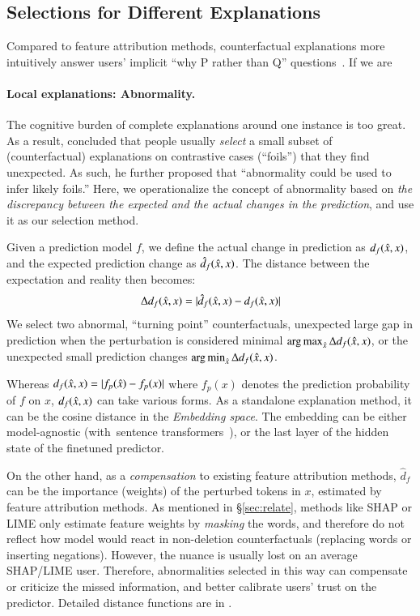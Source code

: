 \subsection{Selections for Different Explanations}

Compared to feature attribution methods, counterfactual explanations more intuitively answer users' implicit ``why P rather than Q'' questions~\cite{miller}.
If we are 


\paragraph{Local explanations: Abnormality.}
The cognitive burden of complete explanations around one instance is too great.
As a result, \citet{miller} concluded that people usually \emph{select} a small subset of (counterfactual) explanations on contrastive cases (``foils'') that they find unexpected. 
As such, he further proposed that ``abnormality could be used to infer likely foils.''
Here, we operationalize the concept of abnormality based on \emph{the discrepancy between the expected and the actual changes in the prediction}, and use it as our selection method.

Given a prediction model $f$, we define the actual change in prediction as $d_f(\hat{x}, x)$, and the expected prediction change as $\hat{d}_f(\hat{x}, x)$.
The distance between the expectation and reality then becomes:
$$\Delta d_f(\hat{x}, x) = |\hat{d}_f(\hat{x}, x)-d_f(\hat{x}, x)|$$
We select two abnormal, ``turning point'' counterfactuals, \ie unexpected large gap in prediction when the perturbation is considered minimal $\operatorname*{arg\,max}_{\hat{x}} \Delta d_f(\hat{x}, x)$, or the unexpected small prediction changes $\operatorname*{arg\,min}_{\hat{x}} \Delta d_f(\hat{x}, x)$.

Whereas $d_f(\hat{x}, x)=|f_p(\hat{x})-f_p(x)|$ where $f_p(x)$ denotes the prediction probability of $f$ on $x$, $d_f(\hat{x}, x)$ can take various forms. 
As a standalone explanation method, it can be the cosine distance in the \emph{Embedding space}.
The embedding can be either model-agnostic (\eg with~sentence transformers~\cite{reimers-2019-sentence-bert}), or the last layer of the hidden state of the finetuned predictor.

On the other hand, as a \emph{compensation} to existing feature attribution methods, $\hat{d}_f$ can be the importance (weights) of the perturbed tokens in $x$, estimated by feature attribution methods.
As mentioned in \S\ref{sec:relate}, methods like SHAP or LIME only estimate feature weights by \emph{masking} the words, and therefore do not reflect how model would react in non-deletion counterfactuals (replacing words or inserting negations).
However, the nuance is usually lost on an average SHAP/LIME user.
Therefore, abnormalities selected in this way can compensate or criticize the missed information, and better calibrate users' trust on the predictor. 
Detailed distance functions are in \tofix{\S\ref{X}}.



